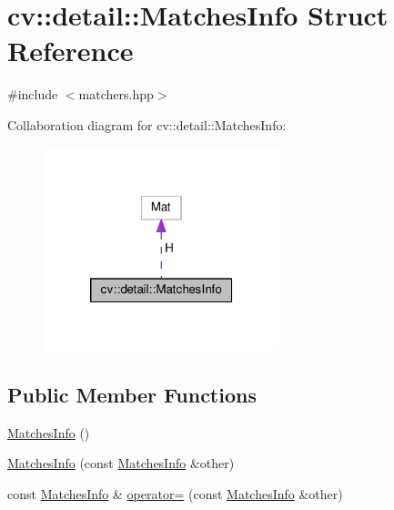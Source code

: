 \hypertarget{structcv_1_1detail_1_1MatchesInfo}{\section{cv\-:\-:detail\-:\-:Matches\-Info Struct Reference}
\label{structcv_1_1detail_1_1MatchesInfo}
}


{\ttfamily \#include $<$matchers.\-hpp$>$}



Collaboration diagram for cv\-:\-:detail\-:\-:Matches\-Info\-:\nopagebreak
\begin{figure}[H]
\begin{center}
\leavevmode
\includegraphics[width=194pt]{structcv_1_1detail_1_1MatchesInfo__coll__graph}
\end{center}
\end{figure}
\subsection*{Public Member Functions}
\begin{DoxyCompactItemize}
\item 
\hyperlink{structcv_1_1detail_1_1MatchesInfo_aeafb1a764b2fe15f8c5c0fcd790f5d2a}{Matches\-Info} ()
\item 
\hyperlink{structcv_1_1detail_1_1MatchesInfo_aa99a3ff020a99c03c4016deadbf28d42}{Matches\-Info} (const \hyperlink{structcv_1_1detail_1_1MatchesInfo}{Matches\-Info} \&other)
\item 
const \hyperlink{structcv_1_1detail_1_1MatchesInfo}{Matches\-Info} \& \hyperlink{structcv_1_1detail_1_1MatchesInfo_adc9a9f6aa980e7b87d5a5ce502770d23}{operator=} (const \hyperlink{structcv_1_1detail_1_1MatchesInfo}{Matches\-Info} \&other)
\end{DoxyCompactItemize}
